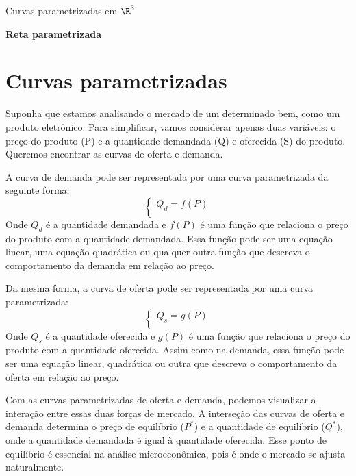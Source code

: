 \begin{example}{Curvas parametrizadas em $\R^3$}

\textbf{Reta parametrizada}


\end{example}






\section{Curvas parametrizadas}





\begin{example}{}{}
Suponha que estamos analisando o mercado de um determinado bem, como um produto eletrônico. Para simplificar, vamos considerar apenas duas variáveis: o preço do produto (P) e a quantidade demandada (Q) e oferecida (S) do produto. Queremos encontrar as curvas de oferta e demanda.

\solution

A curva de demanda pode ser representada por uma curva parametrizada da seguinte forma:
\[\begin{cases}Q_d = f(P) \\\end{cases}\]
Onde \(Q_d\) é a quantidade demandada e \(f(P)\) é uma função que relaciona o preço do produto com a quantidade demandada. Essa função pode ser uma equação linear, uma equação quadrática ou qualquer outra função que descreva o comportamento da demanda em relação ao preço.

Da mesma forma, a curva de oferta pode ser representada por uma curva parametrizada:
\[\begin{cases}Q_s = g(P) \\\end{cases}\]
Onde \(Q_s\) é a quantidade oferecida e \(g(P)\) é uma função que relaciona o preço do produto com a quantidade oferecida. Assim como na demanda, essa função pode ser uma equação linear, quadrática ou outra que descreva o comportamento da oferta em relação ao preço.

Com as curvas parametrizadas de oferta e demanda, podemos visualizar a interação entre essas duas forças de mercado. A interseção das curvas de oferta e demanda determina o preço de equilíbrio (\(P^*\)) e a quantidade de equilíbrio (\(Q^*\)), onde a quantidade demandada é igual à quantidade oferecida. Esse ponto de equilíbrio é essencial na análise microeconômica, pois é onde o mercado se ajusta naturalmente.


\end{example}

